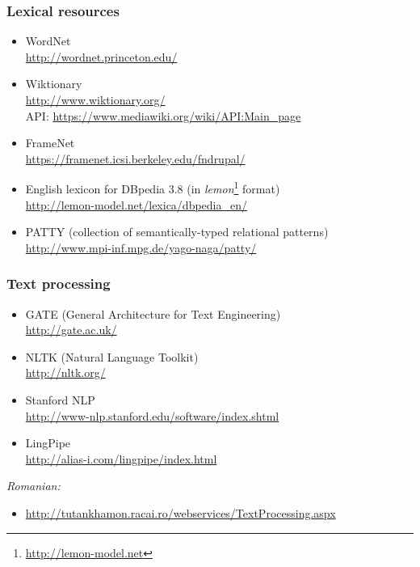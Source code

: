 
\subsubsection*{Lexical resources}

\begin{itemize}
\item WordNet \\ 
      \url{http://wordnet.princeton.edu/}
\item Wiktionary \\
      \url{http://www.wiktionary.org/} \\
      API: \url{https://www.mediawiki.org/wiki/API:Main_page}
\item FrameNet \\
      \url{https://framenet.icsi.berkeley.edu/fndrupal/}            
\item English lexicon for DBpedia 3.8 (in \emph{lemon}\footnote{\url{http://lemon-model.net}} format) \\
      \url{http://lemon-model.net/lexica/dbpedia_en/} 
\item PATTY (collection of semantically-typed relational patterns) \\
      \url{http://www.mpi-inf.mpg.de/yago-naga/patty/}      
\end{itemize}

\subsubsection*{Text processing}

\begin{itemize}
\item GATE (General Architecture for Text Engineering) \\
      \url{http://gate.ac.uk/}
\item NLTK (Natural Language Toolkit) \\
      \url{http://nltk.org/}
\item Stanford NLP \\
      \url{http://www-nlp.stanford.edu/software/index.shtml}
\item LingPipe \\
      \url{http://alias-i.com/lingpipe/index.html}      
\end{itemize}

\emph{Romanian:}
\begin{itemize}
\item 
\url{http://tutankhamon.racai.ro/webservices/TextProcessing.aspx}
\end{itemize}

